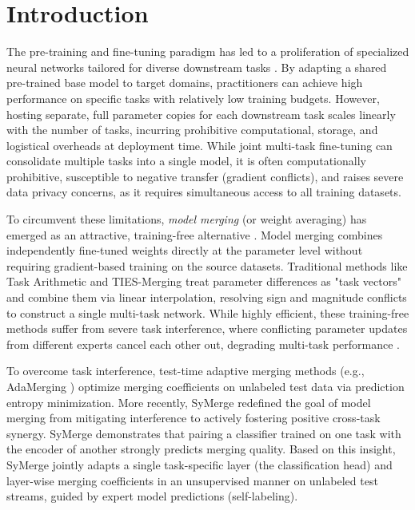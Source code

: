 \documentclass{article}
\theoremstyle{plain}
\theoremstyle{definition}
\theoremstyle{remark}
\begin{document}
\section{Introduction}
\label{sec:intro}
The pre-training and fine-tuning paradigm has led to a proliferation of specialized neural networks tailored for diverse downstream tasks \cite{devlin2018bert,vaswani2017attention,dosovitskiy2021image}. By adapting a shared pre-trained base model to target domains, practitioners can achieve high performance on specific tasks with relatively low training budgets. However, hosting separate, full parameter copies for each downstream task scales linearly with the number of tasks, incurring prohibitive computational, storage, and logistical overheads at deployment time. While joint multi-task fine-tuning can consolidate multiple tasks into a single model, it is often computationally prohibitive, susceptible to negative transfer (gradient conflicts), and raises severe data privacy concerns, as it requires simultaneous access to all training datasets.

To circumvent these limitations, \emph{model merging} (or weight averaging) has emerged as an attractive, training-free alternative \cite{wortsman2022model,ilharco2022editing}. Model merging combines independently fine-tuned weights directly at the parameter level without requiring gradient-based training on the source datasets. Traditional methods like Task Arithmetic \cite{ilharco2022editing} and TIES-Merging \cite{yadav2023ties} treat parameter differences as "task vectors" and combine them via linear interpolation, resolving sign and magnitude conflicts to construct a single multi-task network. While highly efficient, these training-free methods suffer from severe task interference, where conflicting parameter updates from different experts cancel each other out, degrading multi-task performance \cite{yu2024dare,yu2024language}.

To overcome task interference, test-time adaptive merging methods (e.g., AdaMerging \cite{yang2024adamerging}) optimize merging coefficients on unlabeled test data via prediction entropy minimization. More recently, SyMerge \cite{jung2025symerge} redefined the goal of model merging from mitigating interference to actively fostering positive cross-task synergy. SyMerge demonstrates that pairing a classifier trained on one task with the encoder of another strongly predicts merging quality. Based on this insight, SyMerge jointly adapts a single task-specific layer (the classification head) and layer-wise merging coefficients in an unsupervised manner on unlabeled test streams, guided by expert model predictions (self-labeling).
\end{document}
